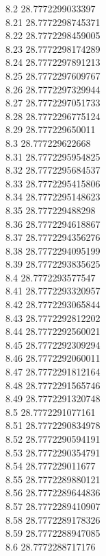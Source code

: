{8.2	28.7772299033397\\
8.21	28.7772298745371\\
8.22	28.7772298459005\\
8.23	28.7772298174289\\
8.24	28.7772297891213\\
8.25	28.7772297609767\\
8.26	28.7772297329944\\
8.27	28.7772297051733\\
8.28	28.7772296775124\\
8.29	28.777229650011\\
8.3	28.777229622668\\
8.31	28.7772295954825\\
8.32	28.7772295684537\\
8.33	28.7772295415806\\
8.34	28.7772295148623\\
8.35	28.777229488298\\
8.36	28.7772294618867\\
8.37	28.7772294356276\\
8.38	28.7772294095199\\
8.39	28.7772293835625\\
8.4	28.7772293577547\\
8.41	28.7772293320957\\
8.42	28.7772293065844\\
8.43	28.7772292812202\\
8.44	28.7772292560021\\
8.45	28.7772292309294\\
8.46	28.7772292060011\\
8.47	28.7772291812164\\
8.48	28.7772291565746\\
8.49	28.7772291320748\\
8.5	28.7772291077161\\
8.51	28.7772290834978\\
8.52	28.7772290594191\\
8.53	28.7772290354791\\
8.54	28.777229011677\\
8.55	28.7772289880121\\
8.56	28.7772289644836\\
8.57	28.7772289410907\\
8.58	28.7772289178326\\
8.59	28.7772288947085\\
8.6	28.7772288717176\\
}
